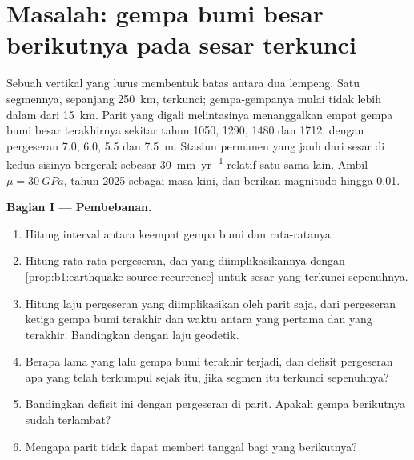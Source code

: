 \section{Masalah: gempa bumi besar berikutnya pada sesar terkunci}

\begin{problem}
\label{pb:b1:earthquake-source:1}
Sebuah  vertikal yang lurus membentuk batas antara dua lempeng. Satu segmennya, sepanjang \qty{250}{km}, terkunci; gempa-gempanya mulai tidak lebih dalam dari \qty{15}{km}. Parit yang digali melintasinya menanggalkan empat gempa bumi besar terakhirnya sekitar tahun 1050, 1290, 1480 dan 1712, dengan pergeseran \num{7.0}, \num{6.0}, \num{5.5} dan \qty{7.5}{m}. Stasiun permanen yang jauh dari sesar di kedua sisinya bergerak sebesar \qty{30}{mm.yr^{-1}} relatif satu sama lain. Ambil $\mu =
\qty{30}{GPa}$, tahun 2025 sebagai masa kini, dan berikan magnitudo hingga 0.01.

\medskip
\noindent\textbf{Bagian I --- Pembebanan.}
\begin{enumerate}
  \item Hitung interval antara keempat gempa bumi dan rata-ratanya.
  \item Hitung rata-rata pergeseran, dan  yang diimplikasikannya dengan \cref{prop:b1:earthquake-source:recurrence} untuk sesar yang terkunci sepenuhnya.
  \item Hitung laju pergeseran yang diimplikasikan oleh parit saja, dari pergeseran ketiga gempa bumi terakhir dan waktu antara yang pertama dan yang terakhir. Bandingkan dengan laju geodetik.
  \item Berapa lama yang lalu gempa bumi terakhir terjadi, dan defisit pergeseran apa yang telah terkumpul sejak itu, jika segmen itu terkunci sepenuhnya?
  \item Bandingkan defisit ini dengan pergeseran di parit. Apakah gempa berikutnya sudah terlambat?
  \item Mengapa parit tidak dapat memberi tanggal bagi yang berikutnya?
\end{enumerate}


\end{problem}
